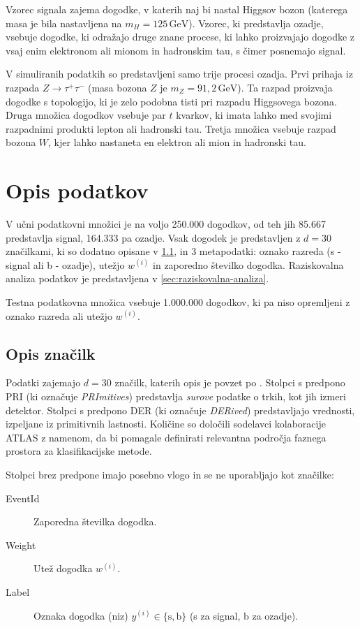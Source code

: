 \documentclass[11pt,a4paper,openany]{book}
\begin{document}
Vzorec signala zajema dogodke, v katerih naj bi nastal Higgsov bozon (katerega masa je bila nastavljena na $m_H = 125\,\text{GeV}$). Vzorec, ki predstavlja ozadje, vsebuje dogodke, ki odražajo druge znane procese, ki lahko proizvajajo dogodke z vsaj enim elektronom ali mionom in hadronskim tau, s čimer posnemajo signal.

V simuliranih podatkih so predstavljeni samo trije procesi ozadja. Prvi prihaja iz razpada $Z \rightarrow \tau^+\tau^-$ (masa bozona $Z$ je $m_Z = 91,2\,\text{GeV}$). Ta razpad proizvaja dogodke s topologijo, ki je zelo podobna tisti pri razpadu Higgsovega bozona. Druga množica dogodkov vsebuje par $t$ kvarkov, ki imata lahko med svojimi razpadnimi produkti lepton ali hadronski tau. Tretja množica vsebuje razpad bozona $W$, kjer lahko nastaneta en elektron ali mion in hadronski tau. 

\section{Opis podatkov}
\label{ch:opis_podatkov}

V učni podatkovni množici je na voljo 250.000 dogodkov, od teh jih 85.667 predstavlja signal, 164.333 pa ozadje. Vsak dogodek je predstavljen z $d = 30$ značilkami, ki so dodatno opisane v \ref{sec:opis-znacilk}, in 3 metapodatki: oznako razreda (s - signal ali b - ozadje), utežjo $w^{(i)}$ in zaporedno številko dogodka. Raziskovalna analiza podatkov je predstavljena v \ref{sec:raziskovalna-analiza}.

Testna podatkovna množica vsebuje 1.000.000 dogodkov, ki pa niso opremljeni z oznako razreda ali utežjo $w^{(i)}$. 

\subsection{Opis značilk}
\label{sec:opis-znacilk}
Podatki zajemajo $d = 30$ značilk, katerih opis je povzet po \cite{Adam-Bourdarios14}. Stolpci s predpono PRI (ki označuje \textit{PRImitives}) predstavlja \textit{surove} podatke o trkih, kot jih izmeri detektor. Stolpci s predpono DER (ki označuje \textit{DERived}) predstavljajo vrednosti, izpeljane iz primitivnih lastnosti. Količine so določili sodelavci kolaboracije ATLAS z namenom, da bi pomagale definirati relevantna področja faznega prostora za klasifikacijske metode.

Stolpci brez predpone imajo posebno vlogo in se ne uporabljajo kot značilke:

\begin{changemargin}{0.5cm}{0.0cm} 
\begin{description}
	\item [EventId] 	Zaporedna številka dogodka.
	\item [Weight]  	Utež dogodka $w^{(i)}$.
	\item [Label] 		Oznaka dogodka (niz) $y^{(i)} \in \{\text{s}, \text{b}\}$ (s za signal, b za ozadje).	
\end{description}
\end{changemargin}
\end{document}
